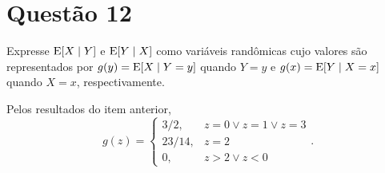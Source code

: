 \section{Questão 12}

Expresse $\mathrm{E}\!\left[X\mid Y\right]$ e $\mathrm{E}\!\left[Y\mid X\right]$ como variáveis randômicas cujo valores são representados por 
$g(y) = \mathrm{E}\!\left[X\mid Y = y\right]$ quando $Y = y$ e 
$g(x) = \mathrm{E}\!\left[Y\mid X = x\right]$ quando $X = x$, respectivamente.

\begin{respostas}
    Pelos resultados do item anterior,
    \begin{equation}
        g(z) = 
        \begin{cases}
            3/2,   & z=0 \vee z=1 \vee z=3 \\
            23/14, & z=2 \\
            0,     & z>2 \vee z<0
        \end{cases}.
    \end{equation}
\end{respostas}